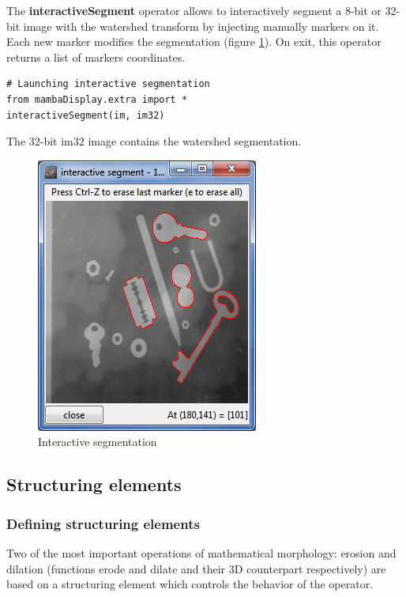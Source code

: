 \documentclass[a4paper,10pt,oneside]{article}
\begin{document}
The \textbf{interactiveSegment} operator allows to interactively segment a 8-bit or 32-bit
image with the watershed transform by injecting manually markers on it. Each new marker modifies
the segmentation (figure \ref{fig:inter_segment}). On exit, this operator returns a list of markers
coordinates.

\lstset{language=Python}
\begin{lstlisting}
# Launching interactive segmentation
from mambaDisplay.extra import *
interactiveSegment(im, im32)
\end{lstlisting}

The 32-bit im32 image contains the watershed segmentation.

\begin{figure}
\centering
\includegraphics[scale=1.0]{images/interactiveSegment.png}
\caption{Interactive segmentation}
\label{fig:inter_segment}
\end{figure}

\subsection{Structuring elements}

 \subsubsection{Defining structuring elements}
 
Two of the most important operations of mathematical morphology: erosion and
dilation (functions erode and dilate and their 3D counterpart respectively)
are based on a structuring element which controls the behavior of the operator.
\end{document}
